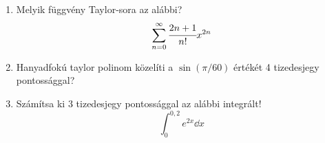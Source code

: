 \documentclass[a4paper, 12pt]{scrartcl}
\begin{document}
\begin{enumerate}
  \item Melyik függvény Taylor-sora az alábbi?
        $$
          \sum_{n=0}^{\infty} \cfrac{2n+1}{n!}x^{2n}
        $$

  \item Hanyadfokú taylor polinom közelíti a $\sin(\pi/60)$ értékét 4
        tizedesjegy pontossággal?

  \item Számítsa ki 3 tizedesjegy pontossággal az alábbi integrált!
        $$
          \int_{0}^{0,2} e^{2x} \dd x
        $$
\end{enumerate}
\end{document}
